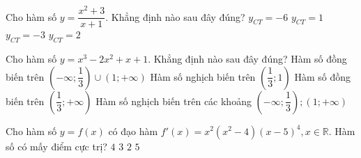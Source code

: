 \begin{ex}%
	Cho hàm số $y=\dfrac{x^2+3}{x+1}$. Khẳng định nào sau đây đúng?
	\choice
	{$y_{CT}=-6 $}
	{$y_{CT}=1 $}
	{$y_{CT}=-3 $}
	{\True $y_{CT}=2 $}
	
\end{ex}
\begin{ex}%
	Cho hàm số $y=x^3-2x^2+x+1$. Khẳng định nào sau đây đúng?
	\choice
	{Hàm số đồng biến trên $\left(-\infty;\dfrac{1}{3}\right)\cup (1;+\infty) $}
	{\True Hàm số nghịch biến trên $\left(\dfrac{1}{3};1\right) $}
	{Hàm số đồng biến trên $\left(\dfrac{1}{3};+\infty\right) $}
	{Hàm số nghịch biến trên các khoảng $\left(-\infty;\dfrac{1}{3}\right); (1;+\infty) $}
	
\end{ex}
\begin{ex}%
	Cho hàm số $y=f(x)$ có đạo hàm $f'(x)=x^2(x^2-4)(x-5)^{4}, x\in\mathbb{R}$. Hàm số có mấy điểm cực trị?
	\choice
	{$4 $}
	{$3 $}
	{\True $2 $}
	{$5 $}
\end{ex}


